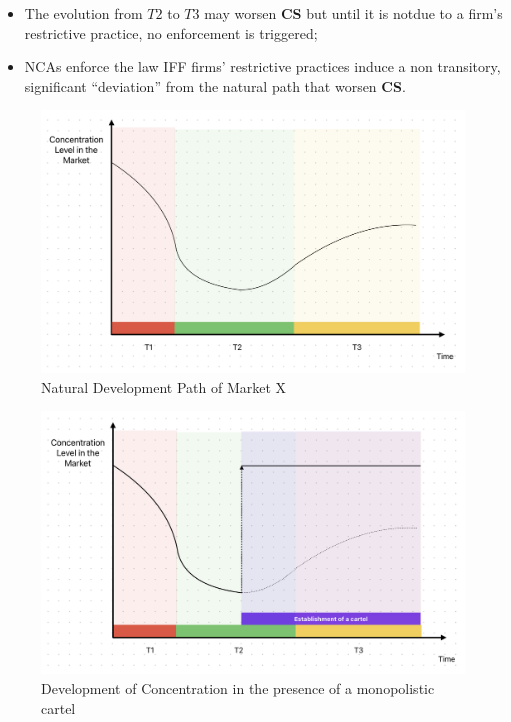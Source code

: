     \begin{itemize}
        \item The evolution from $T2$ to $T3$ may worsen \textcolor{BrickRed}{\textbf{CS}} but until it is notdue to a firm’s restrictive practice, no enforcement is triggered;
        \item NCAs enforce the law IFF firms’ restrictive practices induce a non transitory, significant “deviation” from the natural path that worsen \textcolor{BrickRed}{\textbf{CS}}.
    \end{itemize}

    \begin{figure}[h]
        \centering
        \includegraphics[width=0.85\linewidth]{graphics/Market_evolution.png}
        \caption{Natural Development Path of Market X}
        \label{fig:nat_dev_path_mkt}
    \end{figure}

    \begin{figure}[h]
        \centering
        \includegraphics[width=0.85\linewidth]{graphics/establishment_cartel.png}
        \caption{Development of Concentration in the presence of a monopolistic cartel}
    \end{figure}

